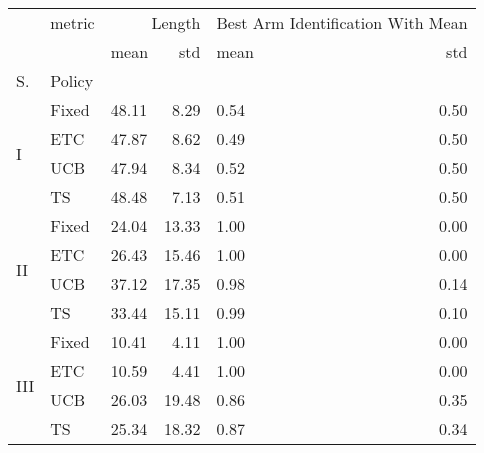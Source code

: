 \begin{tabular}{lllrlr}
\toprule
 & metric & \multicolumn{2}{r}{Length} & \multicolumn{2}{r}{Best Arm Identification With Mean} \\
 &  & mean & std & mean & std \\
S. & Policy &  &  &  &  \\
\midrule
\multirow[c]{4}{*}{I} & Fixed & 48.11 & 8.29 & 0.54 & 0.50 \\
 & ETC & 47.87 & 8.62 & 0.49 & 0.50 \\
 & UCB & 47.94 & 8.34 & 0.52 & 0.50 \\
 & TS & 48.48 & 7.13 & 0.51 & 0.50 \\
\multirow[c]{4}{*}{II} & Fixed & 24.04 & 13.33 & 1.00 & 0.00 \\
 & ETC & 26.43 & 15.46 & 1.00 & 0.00 \\
 & UCB & 37.12 & 17.35 & 0.98 & 0.14 \\
 & TS & 33.44 & 15.11 & 0.99 & 0.10 \\
\multirow[c]{4}{*}{III} & Fixed & 10.41 & 4.11 & 1.00 & 0.00 \\
 & ETC & 10.59 & 4.41 & 1.00 & 0.00 \\
 & UCB & 26.03 & 19.48 & 0.86 & 0.35 \\
 & TS & 25.34 & 18.32 & 0.87 & 0.34 \\
\bottomrule
\end{tabular}
